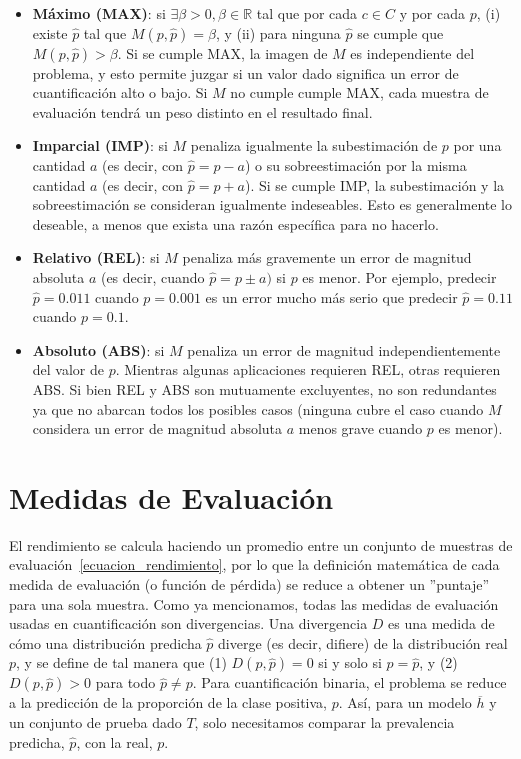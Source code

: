 \begin{itemize}
    \item {\bf Máximo (MAX)}: si $\exists \beta >0, \beta \in \mathbb{R}$ tal
    que por cada $c \in C$ y por cada $p$, (i) existe $\hat p$ tal que $M(p,
    \hat p) = \beta$, y (ii) para ninguna $\hat p$ se cumple que $M(p, \hat p) >
    \beta$. Si se cumple MAX, la imagen de $M$ es independiente del problema, y
    esto permite juzgar si un valor dado significa un error de cuantificación
    alto o bajo. Si $M$ no cumple cumple MAX, cada muestra de evaluación tendrá
    un peso distinto en el resultado final.
    \item {\bf Imparcial (IMP)}: si $M$ penaliza igualmente la subestimación de
    $p$ por una cantidad $a$ (es decir, con $\hat p = p - a$) o su
    sobreestimación por la misma cantidad $a$ (es decir, con $\hat p = p + a$).
    Si se cumple IMP, la subestimación y la sobreestimación se consideran
    igualmente indeseables. Esto es generalmente lo deseable, a menos que exista
    una razón específica para no hacerlo.
    \item {\bf Relativo (REL)}: si $M$ penaliza más gravemente un error de
    magnitud absoluta $a$ (es decir, cuando $\hat p = p \pm a)$ si $p$ es menor.
    Por ejemplo, predecir $\hat p = 0.011$ cuando $p = 0.001$ es un error mucho
    más serio que predecir $\hat p = 0.11$ cuando $p = 0.1$.
    \item {\bf Absoluto (ABS)}: si $M$ penaliza un error de magnitud
    independientemente del valor de $p$. Mientras algunas aplicaciones requieren
    REL, otras requieren ABS. Si bien REL y ABS son mutuamente excluyentes, no
    son redundantes ya que no abarcan todos los posibles casos (ninguna cubre el
    caso cuando $M$ considera un error de magnitud absoluta $a$ menos grave
    cuando $p$ es menor).
\end{itemize}

\section{Medidas de Evaluación}\label{evaluacion:medidas}

El rendimiento se calcula haciendo un promedio entre un conjunto de muestras de
evaluación~\ref{ecuacion_rendimiento}, por lo que la definición matemática de
cada medida de evaluación (o función de pérdida) se reduce a obtener un
''puntaje'' para una sola muestra. Como ya mencionamos, todas las medidas de
evaluación usadas en cuantificación son divergencias. Una divergencia $D$ es una
medida de cómo una distribución predicha $\hat{p}$ diverge (es decir, difiere)
de la distribución real $p$, y se define de tal manera que (1) $D(p, \hat{p}) =
0$ si y solo si $p = \hat{p}$, y (2) $D(p, \hat{p}) > 0$ para todo $\hat{p} \neq
p$. Para cuantificación binaria, el problema se reduce a la predicción de la
proporción de la clase positiva, $p$. Así, para un modelo $\overline{h}$ y un
conjunto de prueba dado $T$, solo necesitamos comparar la prevalencia predicha,
$\hat{p}$, con la real, $p$.

